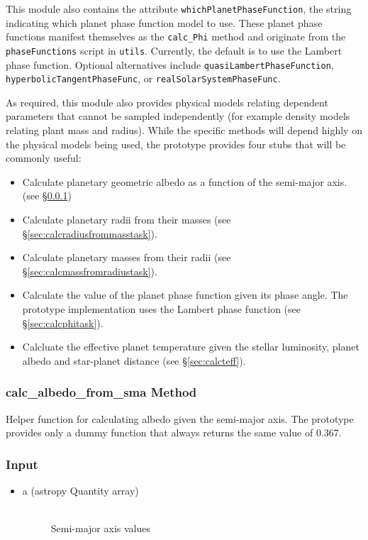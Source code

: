 \documentclass[cleanfoot]{asme2ej}
\begin{document}
This module also contains the attribute \texttt{whichPlanetPhaseFunction}, the string indicating which planet phase function model to use. These planet phase functions manifest themselves as the \texttt{calc\_Phi} method and originate from the \texttt{phaseFunctions} script in \texttt{utils}. Currently, the default is to use the Lambert phase function. Optional alternatives include \texttt{quasiLambertPhaseFunction}, \texttt{hyperbolicTangentPhaseFunc}, or \texttt{realSolarSystemPhaseFunc}.

As required, this module also provides physical models relating dependent parameters that cannot be sampled independently (for example density models relating plant mass and radius).  While the specific methods will depend highly on the physical models being used, the prototype provides four stubs that will be commonly useful:
\begin{itemize}[leftmargin=2in,font={\ttfamily}]
    \item[\texttt calc\_albedo\_from\_sma] Calculate planetary geometric albedo as a function of the semi-major axis. (see \S\ref{sec:calcalbedofromsmatask})
    \item[\texttt calc\_radius\_from\_mass] Calculate planetary radii from their masses (see \S\ref{sec:calcradiusfrommasstask}).
    \item[\texttt calc\_mass\_from\_radius] Calculate planetary masses from their radii (see \S\ref{sec:calcmassfromradiustask}).
    \item[\texttt calc\_Phi] Calculate the value of the planet phase function given its phase angle. The prototype implementation uses the Lambert phase function (see \S\ref{sec:calcphitask}).
    \item[\texttt calc\_Teff] Calcluate the effective planet temperature given the stellar luminosity, planet albedo and star-planet distance (see \S\ref{sec:calcteff}).
\end{itemize}

\subsubsection{calc\_albedo\_from\_sma Method} \label{sec:calcalbedofromsmatask}
Helper function for calculating albedo given the semi-major axis. The prototype provides only a dummy function that always returns the same value of 0.367.
\subsubsection*{Input}
\begin{itemize}
\item
\begin{description}
    \item[a (astropy Quantity array)] \hfill \\ Semi-major axis values
\end{description}
\end{itemize}
\end{document}
